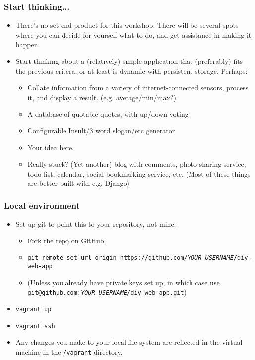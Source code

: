 \documentclass{beamer}
\begin{document}
\begin{frame}
  \frametitle{Start thinking...}
  \begin{itemize}
  \item There's no set end product for this workshop. There will be
    several spots where you can decide for yourself what to do, and
    get assistance in making it happen.

  \item Start thinking about a (relatively) simple application that
    (preferably) fits the previous critera, or at least is dynamic
    with persistent storage. Perhaps:
    \begin{itemize}
    \item Collate information from a variety of internet-connected
      sensors, process it, and display a
      result. (e.g. average/min/max?)
    \item A database of quotable quotes, with up/down-voting
    \item Configurable Insult/3 word slogan/etc
      generator
    \item Your idea here.
    \item Really stuck? (Yet another) blog with comments, photo-sharing service,
      todo list, calendar, social-bookmarking service, etc. (Most of
      these things are better built with e.g. Django)
    \end{itemize}
  \end{itemize}
\end{frame}


\begin{frame}
  \frametitle{Local environment}
  \begin{itemize}
  \item Set up git to point this to your repository, not mine.
    \begin{itemize}
    \item Fork the repo on GitHub.
    \item \texttt{git remote set-url origin
        https://github.com/\textit{YOUR USERNAME}/diy-web-app}
    \item (Unless you already have private keys set up, in which case
      use \texttt{git@github.com:\textit{YOUR USERNAME}/diy-web-app.git})
    \end{itemize}
  \item \texttt{vagrant up}
  \item \texttt{vagrant ssh}
  \item Any changes you make to your local file system are reflected in the virtual machine in the \texttt{/vagrant} directory.
  \end{itemize}
\end{frame}
\end{document}
